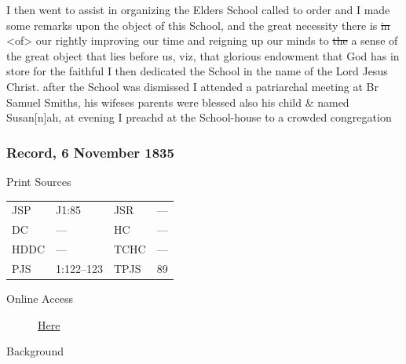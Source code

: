 				I then went to assist in organizing the Elders School called to order and I made some remarks upon the object of this School, and the great necessity there is \sout{in} <of> our rightly improving our time and reigning up our minds to \sout{the} a sense of the great object that lies before us, viz, that glorious endowment that God has in store for the faithful I then dedicated the School in the name of the Lord Jesus Christ. after the School was dismissed I attended a patriarchal meeting at Br Samuel Smiths, his wifeses parents were blessed also his child \& named Susan[n]ah, at evening I preachd at the School-house to a crowded congregation
				
		\subsubsection{Record, 6 November 1835}
			\label{EMS-1835-JS-6-NOV-1835}
			
			\begin{description}
				\item[Print Sources]
			\end{description}

				\begin{tabular}{p{0.5in}p{1in}p{0.5in}p{1in}}
				JSP	 	& J1:85			& JSR 		& ---  \\
				DC	 	& --- 			& HC 		& ---  \\
				HDDC 	& ---			& TCHC 		& ---  \\
				PJS 	& 1:122--123	& TPJS 		& 89   \\
				\end{tabular}
			
			\begin{description}
				\item[Online Access] \href{https://www.josephsmithpapers.org/paper-summary/journal-1835-1836/21}{Here}
			\end{description}
			
			\begin{description}
				\item[Background]
			\end{description}
			
			
